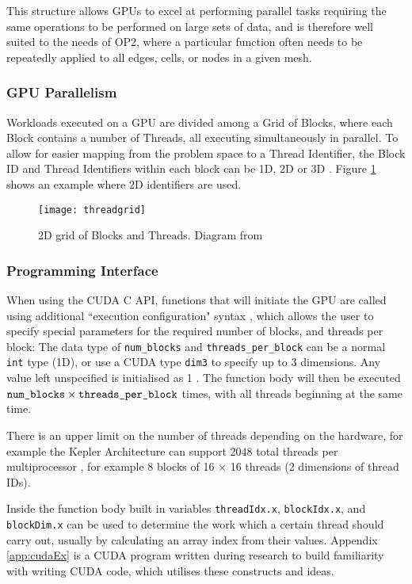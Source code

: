 \par
\noindent This structure allows GPUs to excel at performing parallel tasks requiring the same operations to be performed on large sets of data, and is therefore well suited to the needs of OP2, where a particular function often needs to be repeatedly applied to all edges, cells, or nodes in a given mesh.

\subsubsection{GPU Parallelism}
Workloads executed on a GPU are divided among a Grid of Blocks, where each Block contains a number of Threads, all executing simultaneously in parallel. To allow for easier mapping from the problem space to a Thread Identifier, the Block ID and Thread Identifiers within each block can be 1D, 2D or 3D \cite[p9]{guide}. Figure \ref{fig:threadgrid} shows an example where 2D identifiers are used.

\begin{figure}[h!]
  \centering
  \texttt{[image: threadgrid]}
  \caption{\label{fig:threadgrid} 2D grid of Blocks and Threads. Diagram from \cite[p9]{guide}}
\end{figure}

\subsubsection{Programming Interface}
When using the CUDA C API, functions that will initiate the GPU are called using additional ``execution configuration" syntax \cite[p7]{guide}, which allows the user to specify special parameters for the required number of blocks, and threads per block:
\noindent The data type of \verb|num_blocks| and \verb|threads_per_block| can be a normal \verb|int| type (1D), or use a CUDA type \verb|dim3| \cite[p9]{guide} to specify up to 3 dimensions. Any value left unspecified is initialised as 1 \cite[p87]{guide}. The function body will then be executed $\verb|num_blocks| \times \verb|threads_per_block|$ times, with all threads beginning at the same time.
\par There is an upper limit on the number of threads depending on the hardware, for example the Kepler Architecture can support 2048 total threads per multiprocessor \cite{kepler}, for example 8 blocks of 16 $\times$ 16 threads (2 dimensions of thread IDs).
\par
Inside the function body built in variables \verb|threadIdx.x|, \verb|blockIdx.x|, and \verb|blockDim.x| can be used to determine the work which a certain thread should carry out, usually by calculating an array index from their values. Appendix \ref{app:cudaEx} is a CUDA program written during research to build familiarity with writing CUDA code, which utilises these constructs and ideas.

